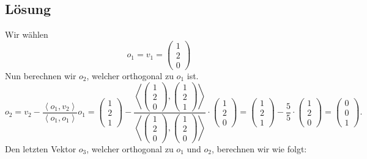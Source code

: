 \documentclass[german,12pt]{homework}
\newcommand{\dotproduct}[2]{\left\langle#1, #2\right\rangle}
\begin{document}
    \subsection*{Lösung}
    Wir wählen
    \[o_1 = v_1 = \begin{pmatrix}1\\2\\0\end{pmatrix}\]
    Nun berechnen wir \(o_2\), welcher orthogonal zu \(o_1\) ist.
    \[o_2 = v_2 - \frac{\dotproduct{o_1}{v_2}}{\dotproduct{o_1}{o_1}}o_1 =
    \begin{pmatrix}1\\2\\1\end{pmatrix} -
    \frac{\dotproduct{\begin{pmatrix}1\\2\\0\end{pmatrix}}{\begin{pmatrix}1\\2\\
    1\end{pmatrix}}}{\dotproduct{\begin{pmatrix}1\\2\\0\end{pmatrix}}{
    \begin{pmatrix}1\\2\\0\end{pmatrix}}} \cdot
    \begin{pmatrix}1\\2\\0\end{pmatrix} = \begin{pmatrix}1\\2\\1\end{pmatrix} -
    \frac{5}{5} \cdot \begin{pmatrix}1\\2\\0\end{pmatrix} =
    \begin{pmatrix}0\\0\\1\end{pmatrix}.\]
    Den letzten Vektor \(o_3\), welcher orthogonal zu \(o_1\) und \(o_2\),
    berechnen wir wie folgt:
\end{document}
